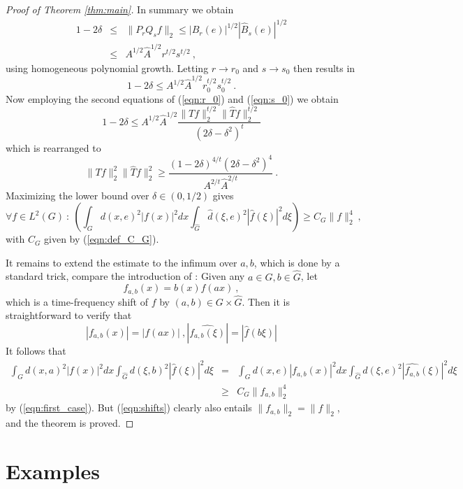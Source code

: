 \documentclass[12pt, reqno]{amsart}
\begin{document}
\begin{proof}[Proof of Theorem \ref{thm:main}]
In summary we obtain 
\begin{eqnarray*}
1-2 \delta & \le & \| P_{r} Q_{s} f \|_2 \le |B_{r}(e)|^{1/2} |\widehat{B}_{s}(e)|^{1/2} \\
& \le & A^{1/2} \widehat{A}^{1/2} r^{t/2} s^{t/2}~,
\end{eqnarray*}
using homogeneous polynomial growth.
Letting $r\to r_0$ and $s \to s_0$ then results in 
\[
1-2 \delta \le  A^{1/2} \widehat{A}^{1/2} r_0^{t/2} s_0^{t/2}~.
\]
Now employing the second equations of (\ref{eqn:r_0}) and (\ref{eqn:s_0}) we obtain
\[
    1 - 2 \delta \le  A^{1/2} \widehat{A}^{1/2} \frac{\| Tf \|_2^{t/2} \|\widehat{T} f \|_2^{t/2}}{(2 \delta - \delta^2)^t}
\]
which is rearranged to 
\[
\| Tf \|_2^2 \|\widehat{T} f \|_2^2 \ge \frac{(1-2\delta)^{4/t}(2 \delta - \delta^2)^4}{A^{2/t} \widehat{A}^{2/t}}~.
\]
Maximizing the lower bound over $\delta \in (0,1/2)$ gives
\begin{equation} \label{eqn:first_case}
\forall f \in L^2(G) ~:~ \left( \int_G d(x,e)^2 |f(x)|^2 dx \int_{\widehat{G}} \widehat{d}(\xi,e)^2 |\widehat{f}(\xi)|^2 d\xi \right) \ge C_G \|f\|_2^4~,
\end{equation} with $C_G$ given by (\ref{eqn:def_C_G}).

It remains to extend the estimate to the infimum over $a,b$, which is done by a standard trick, compare the introduction of \cite{MR1448337}:
Given any $a \in G, b \in \widehat{G}$, let
\[
f_{a,b}(x) = b(x) f(ax)~,
\] which is a time-frequency shift of $f$ by $(a,b) \in G \times \widehat{G}$. Then it is straightforward to verify that 
\begin{equation} \label{eqn:shifts}
|f_{a,b}(x)|= |f(ax)|~,|\widehat{f_{a,b}(\xi)}| = |\widehat{f} (b \xi)|
\end{equation}
It follows that 
\begin{eqnarray*}
\int_G d(x,a)^2 |f(x)|^2 dx \int_{\widehat{G}} d(\xi,b)^2 |\widehat{f}(\xi)|^2 d\xi 
& = & \int_G d(x,e) |f_{a,b}(x)|^2 dx \int_{\widehat{G}} d(\xi,e)^2 |\widehat{f_{a,b}}(\xi)|^2 d\xi \\
& \ge & C_G \| f_{a,b} \|_2^4 
\end{eqnarray*}
by (\ref{eqn:first_case}). But (\ref{eqn:shifts}) clearly also entails $\| f_{a,b} \|_2 = \| f  \|_2$, and the theorem is proved. 
\end{proof}

\section{Examples}
\end{document}
